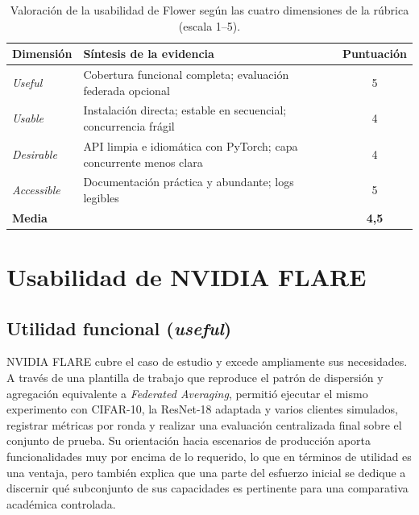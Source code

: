 \begin{table}[htbp]
  \centering
  \caption{Valoración de la usabilidad de Flower según las cuatro dimensiones de la
  rúbrica (escala 1--5).}
  \label{tab:usab-flower}
  \begin{tabular}{llc}
    \toprule
    \textbf{Dimensión} & \textbf{Síntesis de la evidencia} & \textbf{Puntuación} \\
    \midrule
    \textit{Useful}     & Cobertura funcional completa; evaluación federada opcional        & 5 \\
    \textit{Usable}     & Instalación directa; estable en secuencial; concurrencia frágil   & 4 \\
    \textit{Desirable}  & API limpia e idiomática con PyTorch; capa concurrente menos clara & 4 \\
    \textit{Accessible} & Documentación práctica y abundante; logs legibles                 & 5 \\
    \midrule
    \textbf{Media}      &                                                                   & \textbf{4{,}5} \\
    \bottomrule
  \end{tabular}
\end{table}

\section{Usabilidad de NVIDIA FLARE}\label{sec:usab-flare}

\subsection{Utilidad funcional (\textit{useful})}\label{sec:usab-flare-useful}

NVIDIA FLARE cubre el caso de estudio y excede ampliamente sus necesidades. A través de una
plantilla de trabajo que reproduce el patrón de dispersión y agregación equivalente a
\textit{Federated Averaging}, permitió ejecutar el mismo experimento con CIFAR-10, la
ResNet-18 adaptada y varios clientes simulados, registrar métricas por ronda y realizar una
evaluación centralizada final sobre el conjunto de prueba. Su orientación hacia escenarios
de producción aporta funcionalidades muy por encima de lo requerido, lo que en términos de
utilidad es una ventaja, pero también explica que una parte del esfuerzo inicial se dedique
a discernir qué subconjunto de sus capacidades es pertinente para una comparativa académica
controlada.

